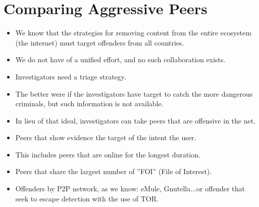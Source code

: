 \documentclass[notes]{beamer}
\begin{document}
\section{Comparing Aggressive Peers}
\begin{frame}

\begin{itemize}

\item[\checkmark]We know that the strategies for removing content from the entire ecosystem (the internet) must target offenders from all countries.

\item[\checkmark]We do not have of a unified effort, and no such collaboration exists.

\item[\checkmark]Investigators need a triage strategy.

\item[\checkmark]The better were if the investigators have target to catch the more dangerous criminals, but such information is not available.

\end{itemize}

\end{frame}

\begin{frame}

\begin{itemize}

\item[\checkmark]In lieu of that ideal, investigators can take peers that are offensive in the net.

\item[\checkmark]Peers that show evidence the target of the intent the user.

\item[\checkmark]This includes peers that are online for the longest duration.

\item[\checkmark]Peers that share the largest number of ''FOI'' (File of Interest).

\item[\checkmark]Offenders by P2P network, as we know: eMule, Gnutella...or offender that seek to escape detection with the use of TOR.

\end{itemize}

\end{frame}
\end{document}
